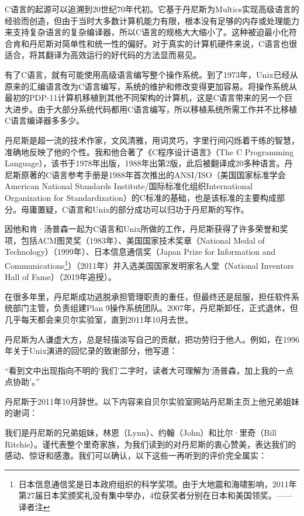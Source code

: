 \documentclass[a4paper,12pt,UTF8,twoside]{ctexbook}
\begin{document}
C语言的起源可以追溯到20世纪70年代初。它基于丹尼斯为Multics实现高级语言的经验而创造，但由于当时大多数计算机能力有限，根本没有足够的内存或处理能力来支持复杂语言的复杂编译器，所以C语言的规格大大缩小了。这种被迫最小化符合肯和丹尼斯对简单性和统一性的偏好。对于真实的计算机硬件来说，C语言也很适合，将其翻译为高效运行的好代码的方法显而易见。

有了C语言，就有可能使用高级语言编写整个操作系统。到了1973年，Unix已经从原来的汇编语言改为C语言编写，系统的维护和修改变得更加容易。将操作系统从最初的PDP-11计算机移植到其他不同架构的计算机，这是C语言带来的另一个巨大进步。由于大部分系统代码都用C语言编写，所以移植系统所需工作并不比移植C语言编译器多多少。

丹尼斯是超一流的技术作家，文风清雅，用词灵巧，字里行间闪烁着干练的智慧，准确地反映了他的个性。我和他合著了《C程序设计语言》（The C Programming Language），该书于1978年出版，1988年出第2版，此后被翻译成20多种语言。丹尼斯原著的C语言参考手册是1988年首次推出的ANSI/ISO（美国国家标准学会American National Standards Institute/国际标准化组织International Organization for Standardization）的C标准的基础，也是该标准的主要构成部分。毋庸置疑，C语言和Unix的部分成功可以归功于丹尼斯的写作。

因他和肯·汤普森一起为C语言和Unix所做的工作，丹尼斯获得了许多荣誉和奖项，包括ACM图灵奖（1983年）、美国国家技术奖章（National Medal of Technology）（1999年）、日本信息通信奖（Japan Prize for Information and Communications\footnote{日本信息通信奖是日本政府组织的科学奖项。由于大地震和海啸影响，2011年第27届日本奖颁奖礼没有集中举办，4位获奖者分别在日本和美国领奖。——译者注}）（2011年）并入选美国国家发明家名人堂（National Inventors Hall of Fame）（2019年追授）。

在很多年里，丹尼斯成功逃脱承担管理职责的重任，但最终还是屈服，担任软件系统部门主管，负责组建Plan 9操作系统团队。2007年，丹尼斯卸任，正式退休，但几乎每天都会来贝尔实验室，直到2011年10月去世。

丹尼斯为人谦虚大方，总是轻描淡写自己的贡献，把功劳归于他人。例如，在1996年关于Unix演进的回忆录的致谢部分，他写道：

“看到文中出现指向不明的‘我们’二字时，读者大可理解为‘汤普森，加上我的一点点协助’。”

丹尼斯于2011年10月辞世。以下内容来自贝尔实验室网站丹尼斯主页上他兄弟姐妹的谢词：

我们是丹尼斯的兄弟姐妹，林恩（Lynn）、约翰（John）和比尔·里奇（Bill Ritchie）。谨代表整个里奇家族，为我们读到的对丹尼斯的衷心赞美，表达我们的感动、惊讶和感激。我们可以确认，以下这些一再听到的评价完全属实：
\end{document}
